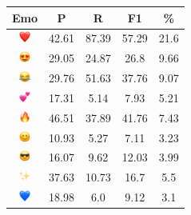 \documentclass{article}
\begin{document}
\begin{table}
\centering
\begin{tabular}{|c|ccc|c|} \hline
\textbf{Emo} & \textbf{P} & \textbf{R} & \textbf{F1} & \textbf{\%} \\ \hline
\includegraphics[height=0.37cm,width=0.37cm]{img/red_heart.png} & 42.61 & 87.39 & 57.29 & 21.6\\ 
\includegraphics[height=0.37cm,width=0.37cm]{img/smiling_face_with_hearteyes.png} & 29.05 & 24.87 & 26.8 & 9.66\\ 
\includegraphics[height=0.37cm,width=0.37cm]{img/face_with_tears_of_joy.png} & 29.76 & 51.63 & 37.76 & 9.07\\ 
\includegraphics[height=0.37cm,width=0.37cm]{img/two_hearts.png} & 17.31 & 5.14 & 7.93 & 5.21\\ 
\includegraphics[height=0.37cm,width=0.37cm]{img/fire.png} & 46.51 & 37.89 & 41.76 & 7.43\\ 
\includegraphics[height=0.37cm,width=0.37cm]{img/smiling_face_with_smiling_eyes.png} & 10.93 & 5.27 & 7.11 & 3.23\\ 
\includegraphics[height=0.37cm,width=0.37cm]{img/smiling_face_with_sunglasses.png} & 16.07 & 9.62 & 12.03 & 3.99\\ 
\includegraphics[height=0.37cm,width=0.37cm]{img/sparkles.png} & 37.63 & 10.73 & 16.7 & 5.5\\ 
\includegraphics[height=0.37cm,width=0.37cm]{img/blue_heart.png} & 18.98 & 6.0 & 9.12 & 3.1\\ 

\end{tabular}
\end{table}
\end{document}
